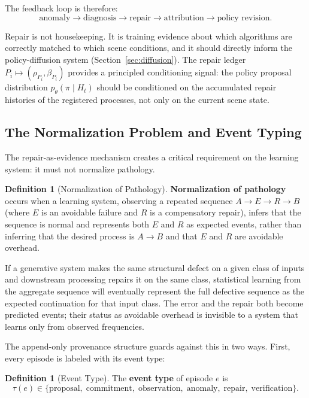\documentclass[11pt,a4paper]{article}
\theoremstyle{plain}
\theoremstyle{definition}
\newtheorem{definition}[theorem]{Definition}
\theoremstyle{remark}
\begin{document}
The feedback loop is therefore:
\[
\text{anomaly} \to \text{diagnosis} \to \text{repair} \to \text{attribution} \to \text{policy revision}.
\]

Repair is not housekeeping. It is training evidence about which algorithms are correctly matched to which scene conditions, and it should directly inform the policy-diffusion system (Section~\ref{sec:diffusion}). The repair ledger $P_i \mapsto (\rho_{P_i}, \beta_{P_i})$ provides a principled conditioning signal: the policy proposal distribution $p_\theta(\pi \mid H_t)$ should be conditioned on the accumulated repair histories of the registered processes, not only on the current scene state.

\subsection{The Normalization Problem and Event Typing}

The repair-as-evidence mechanism creates a critical requirement on the learning system: it must not normalize pathology.

\begin{definition}[Normalization of Pathology]
\textbf{Normalization of pathology} occurs when a learning system, observing a repeated sequence $A \to E \to R \to B$ (where $E$ is an avoidable failure and $R$ is a compensatory repair), infers that the sequence is normal and represents both $E$ and $R$ as expected events, rather than inferring that the desired process is $A \to B$ and that $E$ and $R$ are avoidable overhead.
\end{definition}

If a generative system makes the same structural defect on a given class of inputs and downstream processing repairs it on the same class, statistical learning from the aggregate sequence will eventually represent the full defective sequence as the expected continuation for that input class. The error and the repair both become predicted events; their status as avoidable overhead is invisible to a system that learns only from observed frequencies.

The append-only provenance structure guards against this in two ways. First, every episode is labeled with its event type:

\begin{definition}[Event Type]
The \textbf{event type} of episode $e$ is
\[
\tau(e) \in \{\mathrm{proposal},\; \mathrm{commitment},\; \mathrm{observation},\; \mathrm{anomaly},\; \mathrm{repair},\; \mathrm{verification}\}.
\]
\end{definition}
\end{document}
